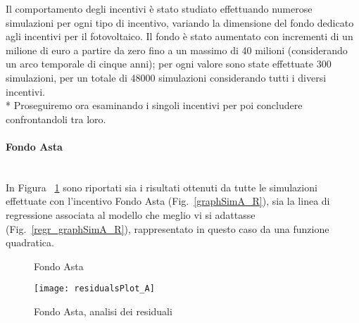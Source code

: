 \documentclass[12pt,a4paper,openright,twoside]{report}
\newcommand{\myparagraph}[1]{\paragraph{#1}\mbox{}\\}
\begin{document}
Il comportamento degli incentivi è stato studiato effettuando numerose simulazioni per ogni tipo di incentivo, variando la dimensione del fondo dedicato agli incentivi per il fotovoltaico. Il fondo è stato aumentato con incrementi di un milione di euro a partire da zero  fino a un massimo di 40 milioni (considerando un arco temporale di cinque anni); per ogni valore sono state effettuate 300 simulazioni, per un totale di 48000 simulazioni considerando tutti i diversi incentivi.\\*
Proseguiremo ora esaminando i singoli incentivi per poi concludere confrontandoli tra loro.

\myparagraph{Fondo Asta}

In Figura ~\ref{graphSimA} sono riportati sia i risultati ottenuti da tutte le simulazioni effettuate con l'incentivo Fondo Asta (Fig.~\ref{graphSimA_R}), sia la linea di regressione associata al modello che meglio vi si adattasse (Fig.~\ref{regr_graphSimA_R}), rappresentato in questo caso da una funzione quadratica.

\begin{figure}[H]
	\centering
	\qquad
	\caption{Fondo Asta}
	\label{graphSimA}
\end{figure}

\begin{figure}[hbt]
	\centering
	\texttt{[image: residualsPlot\_A]}
	\caption{Fondo Asta, analisi dei residuali}
	\label{residualsPlot_A}
\end{figure}
\end{document}
